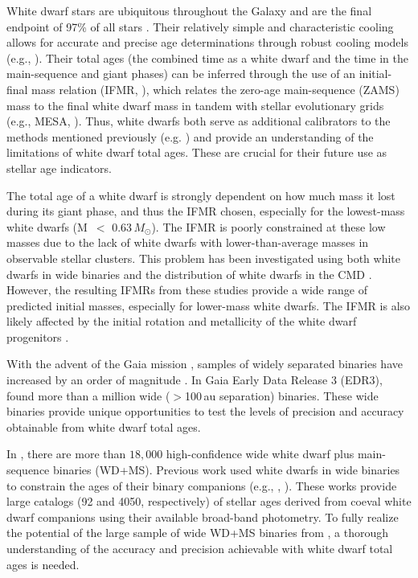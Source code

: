\documentclass[twocolumn]{aastex631}
\newcommand{\msun}{$M_{\odot}$}
\begin{document}
White dwarf stars are ubiquitous throughout the Galaxy and are the final endpoint of 97\% of all stars \citep{2001PASP..113..409F}. Their relatively simple and characteristic cooling allows for accurate and precise age determinations through robust cooling models (e.g., \citealt{2020ApJ...901...93B}). Their total ages (the combined time as a white dwarf and the time in the main-sequence and giant phases) can be inferred through the use of an initial-final mass relation (IFMR, \citealt{1983A&A...121...77W,2008MNRAS.387.1693C,2008ApJ...676..594K,2009ApJ...692.1013S,2009ApJ...693..355W,2018ApJ...866...21C,2024MNRAS.527.3602C}), which relates the zero-age main-sequence (ZAMS) mass to the final white dwarf mass in tandem with stellar evolutionary grids (e.g., MESA, \citealt{2016ApJS..222....8D}). Thus, white dwarfs both serve as additional calibrators to the methods mentioned previously (e.g. \citealt{2023MNRAS.526.4787R}) and provide an understanding of the limitations of white dwarf total ages. These are crucial for their future use as stellar age indicators.

The total age of a white dwarf is strongly dependent on how much mass it lost during its giant phase, and thus the IFMR chosen, especially for the lowest-mass white dwarfs (M~$<$ 0.63\,\msun). The IFMR is poorly constrained at these low masses due to the lack of white dwarfs with lower-than-average masses in observable stellar clusters. This problem has been investigated using both white dwarfs in wide binaries \citep{2012ApJ...746..144Z, 2021ApJ...923..181B, 2024MNRAS.527.9061H} and the distribution of white dwarfs in the CMD \citep{2018ApJ...860L..17E,2024MNRAS.527.3602C}. However, the resulting IFMRs from these studies provide a wide range of predicted initial masses, especially for lower-mass white dwarfs. The IFMR is also likely affected by the initial rotation and metallicity of the white dwarf progenitors \citep{2019ApJ...871L..18C}.

With the advent of the Gaia mission \citep{2016A&A...595A...1G, 2018A&A...616A...1G, 2021A&A...649A...1G}, samples of widely separated binaries have increased by an order of magnitude \citep{2015ApJ...815...63A, 2018MNRAS.480.4884E, Tian}. In Gaia Early Data Release 3 (EDR3), \citet{2021MNRAS.506.2269E} found more than a million wide ($>$100\,au separation) binaries. These wide binaries provide unique opportunities to test the levels of precision and accuracy obtainable from white dwarf total ages. 

In \cite{2021MNRAS.506.2269E}, there are more than $18{,}000$ high-confidence wide white dwarf plus main-sequence binaries (WD+MS). Previous work used white dwarfs in wide binaries to constrain the ages of their binary companions (e.g., \citealt{2019ApJ...870....9F}, \citealt{2021ApJS..253...58Q}). These works provide large catalogs (92 and 4050, respectively) of stellar ages derived from coeval white dwarf companions using their available broad-band photometry. To fully realize the potential of the large sample of wide WD+MS binaries from \cite{2021MNRAS.506.2269E}, a thorough understanding of the accuracy and precision achievable with white dwarf total ages is needed.
\end{document}
